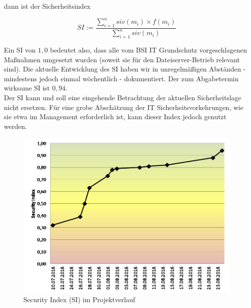dann ist der Sicherheitsindex 

\begin{center}
\begin{equation}
SI:=\frac{\sum_{i=1}^n siv(m_i)\times f(m_i)}{\sum_{i=1}^{n}siv(m_i)}
\end{equation}
\end{center}

Ein SI von $1,0$ bedeutet also, dass alle vom BSI IT Grundschutz vorgeschlagenen Maßnahmen umgesetzt wurden (soweit sie für den Dateiserver-Betrieb relevant sind). Die aktuelle Entwicklung des SI haben wir in unregelmäßigen Abständen - mindestens jedoch einmal wöchentlich - dokumentiert. Der zum Abgabetermin wirksame SI ist $0,94$.\\

Der SI kann und soll eine eingehende Betrachtung der aktuellen Sicherheitslage nicht ersetzen. Für eine grobe Abschätzung der IT Sicherheitsvorkehrungen, wie sie etwa im Management erforderlich ist, kann dieser Index jedoch genutzt werden.

\begin{figure}[hbt!]
	\centering
		\includegraphics[scale=1]{images/si.png} 
	\caption{Security Index (SI) im Projektverlauf}
	\label{img:mypic}
\end{figure}


